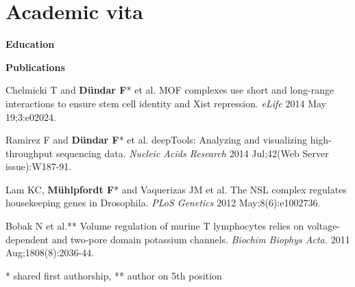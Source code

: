 \documentclass[11pt, a4paper, twoside]{Thesis} %
\begin{document}




\mainmatter %

\pagestyle{fancy} %


%


%



\appendix %




\chapter{Academic vita}
\begin{singlespacing}
\vspace*{-1cm}
\textbf{\Large{Education}}

\vspace*{0.2cm}
\textbf{\Large{Publications}}

Chelmicki T and \textbf{D{\"u}ndar F}* et al. MOF complexes use short and long-range interactions to ensure stem cell identity and Xist repression. \textit{eLife} 2014 May 19;3:e02024.

Ramirez F and \textbf{D{\"u}ndar F}* et al. deepTools: Analyzing and visualizing high-throughput sequencing data. \textit{Nucleic Acids Research} 2014 Jul;42(Web Server issue):W187-91.

Lam KC, \textbf{M{\"u}hlpfordt F}* and Vaquerizas JM et al. The NSL complex regulates housekeeping genes in Drosophila. \textit{PLoS Genetics} 2012 May;8(6):e1002736. 

Bobak N et al.** Volume regulation of murine T lymphocytes relies on voltage-dependent and two-pore domain potassium channels. \textit{Biochim Biophys Acta.} 2011 Aug;1808(8):2036-44.

* shared first authorship, ** author on 5th position
\end{singlespacing}
\end{document}
